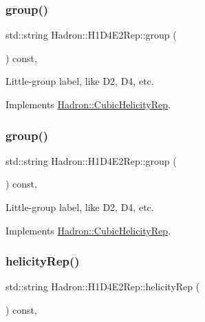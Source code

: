 \subsubsection{\texorpdfstring{group()}{group()}\hspace{0.1cm}{\footnotesize\ttfamily [2/3]}}
{\footnotesize\ttfamily std\+::string Hadron\+::\+H1\+D4\+E2\+Rep\+::group (\begin{DoxyParamCaption}{ }\end{DoxyParamCaption}) const\hspace{0.3cm}{\ttfamily [inline]}, {\ttfamily [virtual]}}

Little-\/group label, like D2, D4, etc. 

Implements \mbox{\hyperlink{structHadron_1_1CubicHelicityRep_a101a7d76cd8ccdad0f272db44b766113}{Hadron\+::\+Cubic\+Helicity\+Rep}}.

\mbox{\label{structHadron_1_1H1D4E2Rep_a136d615d32a53559950775a7e07d5650}} 
\subsubsection{\texorpdfstring{group()}{group()}\hspace{0.1cm}{\footnotesize\ttfamily [3/3]}}
{\footnotesize\ttfamily std\+::string Hadron\+::\+H1\+D4\+E2\+Rep\+::group (\begin{DoxyParamCaption}{ }\end{DoxyParamCaption}) const\hspace{0.3cm}{\ttfamily [inline]}, {\ttfamily [virtual]}}

Little-\/group label, like D2, D4, etc. 

Implements \mbox{\hyperlink{structHadron_1_1CubicHelicityRep_a101a7d76cd8ccdad0f272db44b766113}{Hadron\+::\+Cubic\+Helicity\+Rep}}.

\mbox{\label{structHadron_1_1H1D4E2Rep_a2c58d7ff3d9ef7f2adedc4e0a12db6cb}} 
\subsubsection{\texorpdfstring{helicityRep()}{helicityRep()}\hspace{0.1cm}{\footnotesize\ttfamily [1/2]}}
{\footnotesize\ttfamily std\+::string Hadron\+::\+H1\+D4\+E2\+Rep\+::helicity\+Rep (\begin{DoxyParamCaption}{ }\end{DoxyParamCaption}) const\hspace{0.3cm}{\ttfamily [inline]}, {\ttfamily [virtual]}}

